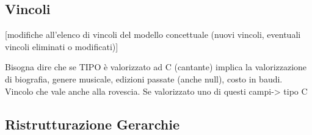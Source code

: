 \documentclass[a4paper,12pt]{article}
\begin{document}
\subsection{Vincoli}
[modifiche all'elenco di vincoli del modello concettuale (nuovi vincoli, eventuali vincoli eliminati o modificati)]

Bisogna dire che se TIPO è valorizzato ad C (cantante) implica la valorizzazione di biografia, genere musicale, edizioni passate (anche null), costo in baudi. Vincolo che vale anche alla rovescia. Se valorizzato uno di questi campi-> tipo C

\subsection{Ristrutturazione Gerarchie}
\end{document}
